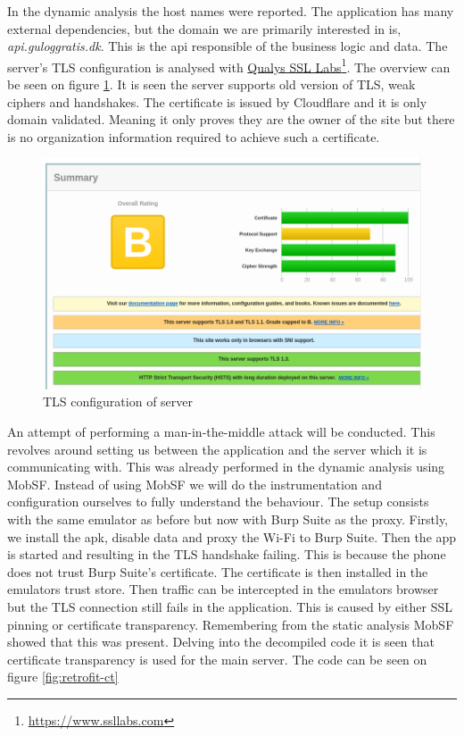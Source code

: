 In the dynamic analysis the host names were reported. The application has many external dependencies, but the domain we are primarily interested in is, \textit{api.guloggratis.dk}. This is the api responsible of the business logic and data. The server's TLS configuration is analysed with \href{https://www.ssllabs.com}{Qualys SSL Labs}\footnote{\href{https://www.ssllabs.com}{https://www.ssllabs.com}}. The overview can be seen on figure \ref{fig:sslreport-overview}. It is seen the server supports old version of TLS, weak ciphers and handshakes. The certificate is issued by Cloudflare and it is only domain validated. Meaning it only proves they are the owner of the site but there is no organization information required to achieve such a certificate.  

\begin{figure}[htbp]
    \centering
    \includegraphics[width=1\columnwidth]{../static-analysis/pictures/sslreport_overview.png}
    \caption{TLS configuration of server}
    \label{fig:sslreport-overview}
\end{figure}

An attempt of performing a man-in-the-middle attack will be conducted. This revolves around setting us between the application and the server which it is communicating with. This was already performed in the dynamic analysis using MobSF. Instead of using MobSF we will do the instrumentation and configuration ourselves to fully understand the behaviour. The setup consists with the same emulator as before but now with Burp Suite as the proxy. Firstly, we install the apk, disable data and proxy the Wi-Fi to Burp Suite. Then the app is started and resulting in the TLS handshake failing. This is because the phone does not trust Burp Suite's certificate. The certificate is then installed in the emulators trust store. Then traffic can be intercepted in the emulators browser but the TLS connection still fails in the application. This is caused by either SSL pinning or certificate transparency. Remembering from the static analysis MobSF showed that this was present. Delving into the decompiled code it is seen that certificate transparency is used for the main server. The code can be seen on figure \ref{fig:retrofit-ct}


